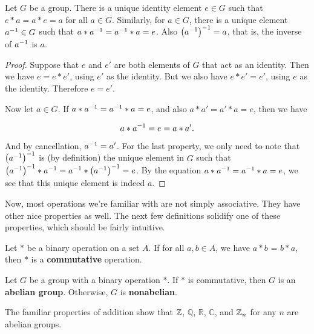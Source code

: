 \begin{theorem}
Let $G$ be a group. There is a unique identity element $e \in G$ such that $e*a = a*e = a$ for all $a \in G$. Similarly, for $a \in G$, there is a unique element $\inv{a} \in G$ such that $a*\inv{a} = \inv{a}*a = e$. Also $\left(\inv{a}\right)^{-1} = a$, that is, the inverse of $\inv a$ is $a$.
\end{theorem}

\begin{proof}
Suppose that $e$ and $e'$ are both elements of $G$ that act as an identity. Then we have $e = e*e'$, using $e'$ as the identity. But we also have $e*e' = e'$, using $e$ as the identity. Therefore $e = e'$.

Now let $a \in G$. If $a*\inv{a} = \inv{a}*a = e$, and also $a*a' = a'*a = e$, then we have

\begin{equation*}
    a*\inv{a} = e = a*a'.
\end{equation*}

And by cancellation, $\inv{a} = a'$. For the last property, we only need to note that $\left(\inv{a}\right)^{-1}$ is (by definition) the unique element in $G$ such that $\left(\inv{a}\right)^{-1} * \inv{a} = \inv{a} * \left(\inv{a}\right)^{-1} = e$. By the equation $a * \inv{a} = \inv{a} * a = e$, we see that this unique element is indeed $a$.

\end{proof}

Now, most operations we're familiar with are not simply associative. They have other nice properties as well. The next few definitions solidify one of these properties, which should be fairly intuitive.

\begin{definition}
Let $*$ be a binary operation on a set $A$. \extra If for all $a, b \in A$, we have $a * b$ = $b * a$, then $*$ is a \textbf{commutative} operation.
\end{definition}

\begin{definition}
Let $G$ be a group with a binary operation $*$. \extra If $*$ is commutative, then $G$ is an \textbf{abelian group}. Otherwise, $G$ is \textbf{nonabelian}.
\end{definition}

\begin{example}
The familiar properties of addition show that $\z$, $\mathbb{Q}$, $\mathbb{R}$, $\mathbb{C}$, and $\zn[n]$ for any $n$ are abelian groups.
\end{example}


